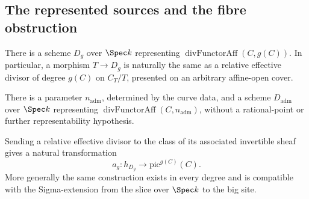 \subsection{The represented sources and the fibre obstruction}

\begin{definition}
  \label{def:genusDivisorRepresentation}
  \leanok
  There is a scheme \(D_g\) over \(\Spec k\) representing
  \(\operatorname{divFunctorAff}(C,g(C))\).  In particular, a morphism
  \(T\to D_g\) is naturally the same as a relative effective divisor of degree \(g(C)\) on
  \(C_T/T\), presented on an arbitrary affine-open cover.
\end{definition}

\begin{definition}
  \label{def:admissibleDivisorRepresentation}
  \leanok
  There is a parameter \(n_{\mathrm{adm}}\), determined by the curve data, and a scheme
  \(D_{\mathrm{adm}}\) over \(\Spec k\) representing
  \(\operatorname{divFunctorAff}(C,n_{\mathrm{adm}})\), without a rational-point or further
  representability hypothesis.
\end{definition}

\begin{definition}
  \label{def:genusAbelMap}
  \leanok
  Sending a relative effective divisor to the class of its associated invertible sheaf gives
  a natural transformation
  \[
    a_g \colon h_{D_g} \longrightarrow \mathrm{pic}^{g(C)}(C).
  \]
  More generally the same construction exists in every degree and is compatible with the
  Sigma-extension from the slice over \(\Spec k\) to the big site.
\end{definition}

